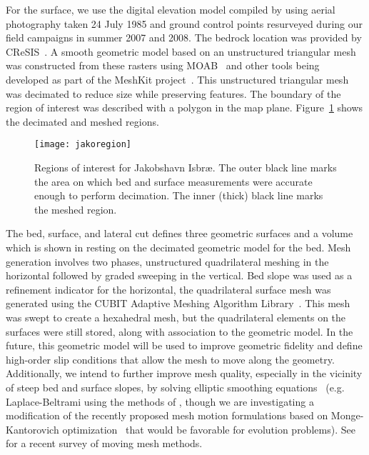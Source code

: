 For the surface, we use the digital elevation model compiled by \citet{motyka2010volume} using aerial photography taken 24 July 1985 and ground control points resurveyed during our field campaigns in summer 2007 and 2008.
The bedrock location was provided by CReSIS~\cite{plummer2011highres}.
A smooth geometric model based on an unstructured triangular mesh was constructed from these rasters using MOAB~\citep{moab} and other tools being developed as part of the MeshKit project~\citep{meshkit}.
This unstructured triangular mesh was decimated to reduce size while preserving features.
The boundary of the region of interest was described with a polygon in the map plane.
Figure~\ref{fig:jakoregion} shows the decimated and meshed regions.

\begin{figure}
  \centering\texttt{[image: jakoregion]}
  \caption{Regions of interest for Jakobshavn Isbr{\ae}.
    The outer black line marks the area on which bed and surface measurements were accurate enough to perform decimation.
    The inner (thick) black line marks the meshed region.}\label{fig:jakoregion}
\end{figure}

The bed, surface, and lateral cut defines three geometric surfaces and a volume which is shown in  resting on the decimated geometric model for the bed.
Mesh generation involves two phases, unstructured quadrilateral meshing in the horizontal followed by graded sweeping in the vertical.
Bed slope was used as a refinement indicator for the horizontal, the quadrilateral surface mesh was generated using the CUBIT Adaptive Meshing Algorithm Library~\citep{blacker1994cmg}.
This mesh was swept to create a hexahedral mesh, but the quadrilateral elements on the surfaces were still stored, along with association to the geometric model.
In the future, this geometric model will be used to improve geometric fidelity and define high-order slip conditions that allow the mesh to move along the geometry.
Additionally, we intend to further improve mesh quality, especially in the vicinity of steep bed and surface slopes, by solving elliptic smoothing equations~\citep{liseikin2009grid} (e.g. Laplace-Beltrami using the methods of \citet{chacon2006fully,hansen2007unstructured,berndt2008efficient}, though we are investigating a modification of the recently proposed mesh motion formulations based on Monge-Kantorovich optimization~\citet{delzanno2008optimal,chacon2011robust} that would be favorable for evolution problems).
See \citet{budd2009adaptivity} for a recent survey of moving mesh methods.

